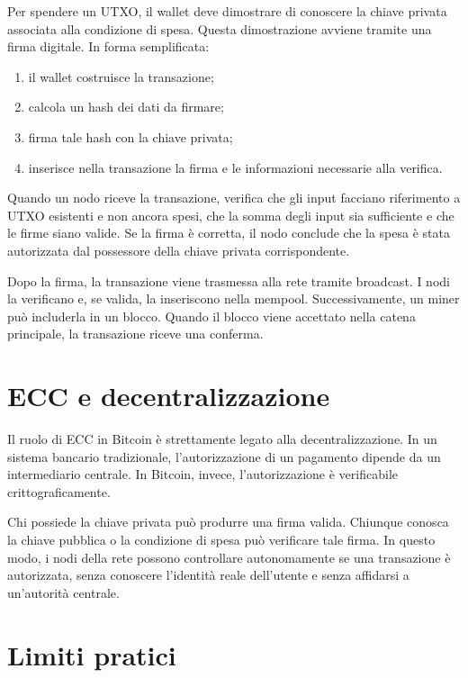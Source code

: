 \documentclass[12pt,a4paper,oneside]{report}
\begin{document}
Per spendere un UTXO, il wallet deve dimostrare di conoscere la chiave privata associata alla condizione di spesa. Questa dimostrazione avviene tramite una firma digitale. In forma semplificata:

\begin{enumerate}
    \item il wallet costruisce la transazione;
    \item calcola un hash dei dati da firmare;
    \item firma tale hash con la chiave privata;
    \item inserisce nella transazione la firma e le informazioni necessarie alla verifica.
\end{enumerate}

Quando un nodo riceve la transazione, verifica che gli input facciano riferimento a UTXO esistenti e non ancora spesi, che la somma degli input sia sufficiente e che le firme siano valide. Se la firma è corretta, il nodo conclude che la spesa è stata autorizzata dal possessore della chiave privata corrispondente.

Dopo la firma, la transazione viene trasmessa alla rete tramite broadcast. I nodi la verificano e, se valida, la inseriscono nella mempool. Successivamente, un miner può includerla in un blocco. Quando il blocco viene accettato nella catena principale, la transazione riceve una conferma.

\section{ECC e decentralizzazione}

Il ruolo di ECC in Bitcoin è strettamente legato alla decentralizzazione. In un sistema bancario tradizionale, l'autorizzazione di un pagamento dipende da un intermediario centrale. In Bitcoin, invece, l'autorizzazione è verificabile crittograficamente.

Chi possiede la chiave privata può produrre una firma valida. Chiunque conosca la chiave pubblica o la condizione di spesa può verificare tale firma. In questo modo, i nodi della rete possono controllare autonomamente se una transazione è autorizzata, senza conoscere l'identità reale dell'utente e senza affidarsi a un'autorità centrale.

\section{Limiti pratici}
\end{document}
